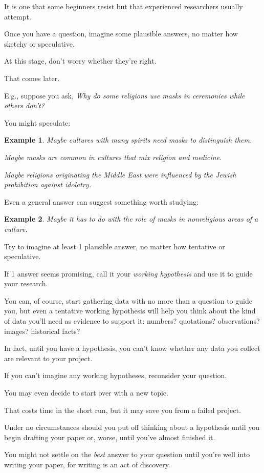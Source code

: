 \documentclass[oneside]{book}
\numberwithin{equation}{section}
\newtheorem{example}{Example}[section]
\begin{document}
It is one that some beginners resist but that experienced researchers usually attempt.

Once you have a question, imagine some plausible answers, no matter how sketchy or speculative.

At this stage, don't worry whether they're right.

That comes later.

%
E.g., suppose you ask, \textit{Why do some religions use masks in ceremonies while others don't?}

You might speculate:
\begin{example}
    Maybe cultures with many spirits need masks to distinguish them.
    
    Maybe masks are common in cultures that mix religion and medicine.
    
    Maybe religions originating the Middle East were influenced by the Jewish prohibition against idolatry.
\end{example}
Even a general answer can suggest something worth studying:
\begin{example}
    Maybe it has to do with the role of masks in nonreligious areas of a culture.
\end{example}
Try to imagine at least 1 plausible answer, no matter how tentative or speculative.

If 1 answer seems promising, call it your \textit{working hypothesis} and use it to guide your research.

You can, of course, start gathering data with no more than a question to guide you, but even a tentative working hypothesis will help you think about the kind of data you'll need as evidence to support it: numbers? quotations? observations? images? historical facts?

In fact, until you have a hypothesis, you can't know whether any data you collect are relevant to your project.

%
If you can't imagine any working hypotheses, reconsider your question.

You may even decide to start over with a new topic.

That costs time in the short run, but it may save you from a failed project.

Under no circumstances should you put off thinking about a hypothesis until you begin drafting your paper or, worse, until you've almost finished it.

You might not settle on the \textit{best} answer to your question until you're well into writing your paper, for writing is an act of discovery.
\end{document}

